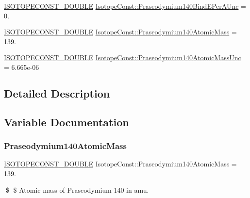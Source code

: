 \begin{DoxyCompactItemize}
\item 
\mbox{\hyperlink{group___isotope_const-_macros_ga8f45a7272ce02c0b4c65c44636ed719a}{I\+S\+O\+T\+O\+P\+E\+C\+O\+N\+S\+T\+\_\+\+D\+O\+U\+B\+LE}} \mbox{\hyperlink{group___isotope_const-_praseodymium-_pr140_ga530c7b4c7300572fe935dcfba7d1d534}{Isotope\+Const\+::\+Praseodymium140\+Bind\+E\+Per\+A\+Unc}} = 0.
\item 
\mbox{\hyperlink{group___isotope_const-_macros_ga8f45a7272ce02c0b4c65c44636ed719a}{I\+S\+O\+T\+O\+P\+E\+C\+O\+N\+S\+T\+\_\+\+D\+O\+U\+B\+LE}} \mbox{\hyperlink{group___isotope_const-_praseodymium-_pr140_ga80e15d4f7df3aef8b520d5dcc65fc7ab}{Isotope\+Const\+::\+Praseodymium140\+Atomic\+Mass}} = 139.
\item 
\mbox{\hyperlink{group___isotope_const-_macros_ga8f45a7272ce02c0b4c65c44636ed719a}{I\+S\+O\+T\+O\+P\+E\+C\+O\+N\+S\+T\+\_\+\+D\+O\+U\+B\+LE}} \mbox{\hyperlink{group___isotope_const-_praseodymium-_pr140_ga4f9a3c303347ad18aa8fa6a5c9be5e81}{Isotope\+Const\+::\+Praseodymium140\+Atomic\+Mass\+Unc}} = 6.\+665e-\/06
\end{DoxyCompactItemize}


\subsection{Detailed Description}


\subsection{Variable Documentation}
\mbox{\label{group___isotope_const-_praseodymium-_pr140_ga80e15d4f7df3aef8b520d5dcc65fc7ab}} 
\subsubsection{\texorpdfstring{Praseodymium140\+Atomic\+Mass}{Praseodymium140AtomicMass}}
{\footnotesize\ttfamily \mbox{\hyperlink{group___isotope_const-_macros_ga8f45a7272ce02c0b4c65c44636ed719a}{I\+S\+O\+T\+O\+P\+E\+C\+O\+N\+S\+T\+\_\+\+D\+O\+U\+B\+LE}} Isotope\+Const\+::\+Praseodymium140\+Atomic\+Mass = 139.}

\$ \$ Atomic mass of Praseodymium-\/140 in amu. \mbox{\label{group___isotope_const-_praseodymium-_pr140_ga4f9a3c303347ad18aa8fa6a5c9be5e81}} 
